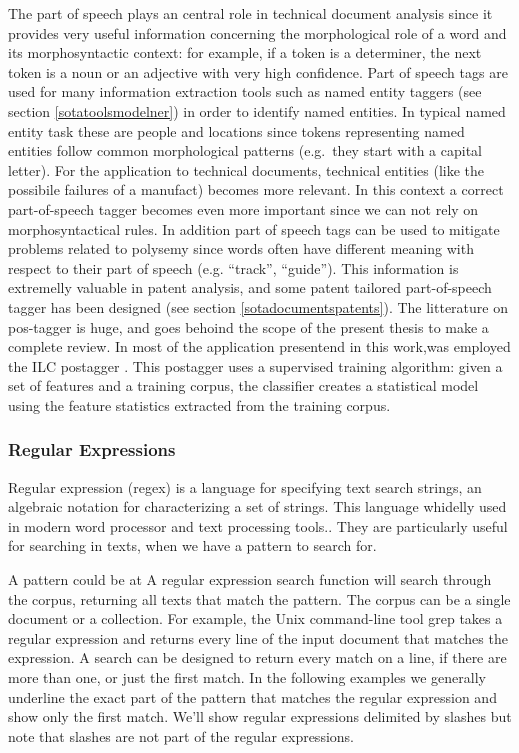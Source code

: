 \documentclass[]{book}
\begin{document}
The part of speech plays an central role in technical document analysis
since it provides very useful information concerning the morphological
role of a word and its morphosyntactic context: for example, if a token
is a determiner, the next token is a noun or an adjective with very high
confidence. Part of speech tags are used for many information extraction
tools such as named entity taggers (see section \ref{sotatoolsmodelner})
in order to identify named entities. In typical named entity task these
are people and locations since tokens representing named entities follow
common morphological patterns (e.g.~they start with a capital letter).
For the application to technical documents, technical entities (like the
possibile failures of a manufact) becomes more relevant. In this context
a correct part-of-speech tagger becomes even more important since we can
not rely on morphosyntactical rules. In addition part of speech tags can
be used to mitigate problems related to polysemy since words often have
different meaning with respect to their part of speech (e.g. ``track'',
``guide''). This information is extremelly valuable in patent analysis,
and some patent tailored part-of-speech tagger has been designed (see
section \ref{sotadocumentspatents}). The litterature on pos-tagger is
huge, and goes behoind the scope of the present thesis to make a
complete review. In most of the application presentend in this work,was
employed the ILC postagger \citep{attardi2006experiments}. This
postagger uses a supervised training algorithm: given a set of features
and a training corpus, the classifier creates a statistical model using
the feature statistics extracted from the training corpus.

\subsubsection{Regular Expressions}\label{sotatoolstransformregex}

Regular expression (regex) is a language for specifying text search
strings, an algebraic notation for characterizing a set of strings. This
language whidelly used in modern word processor and text processing
tools.. They are particularly useful for searching in texts, when we
have a pattern to search for.

A pattern could be at A regular expression search function will search
through the corpus, returning all texts that match the pattern. The
corpus can be a single document or a collection. For example, the Unix
command-line tool grep takes a regular expression and returns every line
of the input document that matches the expression. A search can be
designed to return every match on a line, if there are more than one, or
just the first match. In the following examples we generally underline
the exact part of the pattern that matches the regular expression and
show only the first match. We'll show regular expressions delimited by
slashes but note that slashes are not part of the regular expressions.
\end{document}
